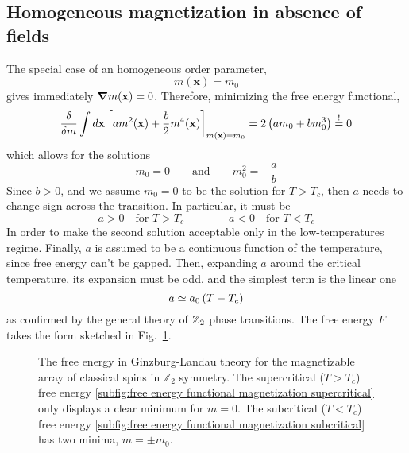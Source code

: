 \subsection{Homogeneous magnetization in absence of fields}

The special case of an homogeneous order parameter,
\[
    m(\mathbf{x}) = m_0
\]
gives immediately $\grad m(\mathbf{x}) = 0$. Therefore, minimizing the free energy functional,
\[
    \fdv{}{m} \int d\mathbf{x} \lrS{ a m^2 (\mathbf{x}) + \frac{b}{2} m^4 (\mathbf{x}) }_{m(\mathbf{x}) = m_0} = 2 \lrR{ am_0 + b m_0^3 } \imp 0
\]
which allows for the solutions
\[
    m_0 = 0
    \qquad\text{and}\qquad
    m_0^2 = -\frac{a}{b} 
\]
Since $b>0$, and we assume $m_0 = 0$ to be the solution for $T > T_c$, then $a$ needs to change sign across the transition. In particular, it must be
\[
    a > 0 \quad\text{for $T>T_c$}
    \qquad\qquad
    a < 0 \quad\text{for $T<T_c$}
\]
In order to make the second solution acceptable only in the low-temperatures regime. Finally, $a$ is assumed to be a continuous function of the temperature, since free energy can't be gapped. Then, expanding $a$ around the critical temperature, its expansion must be odd, and the simplest term is the linear one
\[
    a \simeq a_0 \left({ T - T_c }\right)
\]
as confirmed by the general theory of $\mathbb{Z}_2$ phase transitions. The free energy $F$ takes the form sketched in Fig.~\ref{fig:free energy functional magnetization}.

\begin{figure}
    \centering
    \hspace{2em}
    \caption{The free energy in Ginzburg-Landau theory for the magnetizable array of classical spins in $\mathbb{Z}_2$ symmetry. The supercritical ($T>T_c$) free energy \ref{subfig:free energy functional magnetization supercritical} only displays a clear minimum for $m=0$. The subcritical ($T<T_c$) free energy \ref{subfig:free energy functional magnetization subcritical} has two minima, $m=\pm m_0$. }
    \label{fig:free energy functional magnetization}
\end{figure}

